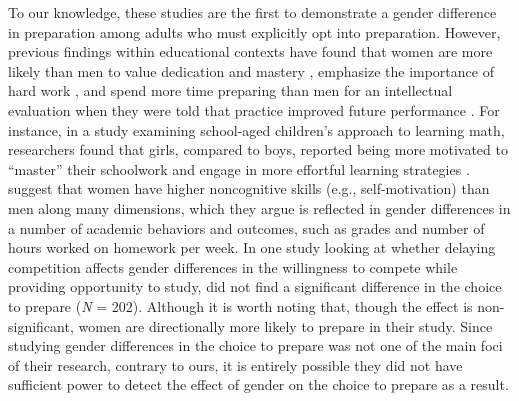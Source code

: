 \documentclass[a4paper, nobind]{templates/ociamthesis}
\begin{document}
To our knowledge, these studies are the first to demonstrate a gender difference in preparation among adults who must explicitly opt into preparation. However, previous findings within educational contexts have found that women are more likely than men to value dedication and mastery \autocite{Leslie2015,Kenney-Benson2006}, emphasize the importance of hard work \autocite{Mccrea2008,Hirt2009,Mccrea2008a}, and spend more time preparing than men for an intellectual evaluation when they were told that practice improved future performance \autocite{Kimble2005}. For instance, in a study examining school-aged children's approach to learning math, researchers found that girls, compared to boys, reported being more motivated to ``master'' their schoolwork and engage in more effortful learning strategies \autocite{Kenney-Benson2006}. \textcite{Becker2010} suggest that women have higher noncognitive skills (e.g., self-motivation) than men along many dimensions, which they argue is reflected in gender differences in a number of academic behaviors and outcomes, such as grades and number of hours worked on homework per week. In one study looking at whether delaying competition affects gender differences in the willingness to compete while providing opportunity to study, \textcite{Charness2021} did not find a significant difference in the choice to prepare (\emph{N} = 202). Although it is worth noting that, though the effect is non-significant, women are directionally more likely to prepare in their study. Since studying gender differences in the choice to prepare was not one of the main foci of their research, contrary to ours, it is entirely possible they did not have sufficient power to detect the effect of gender on the choice to prepare as a result.
\end{document}
